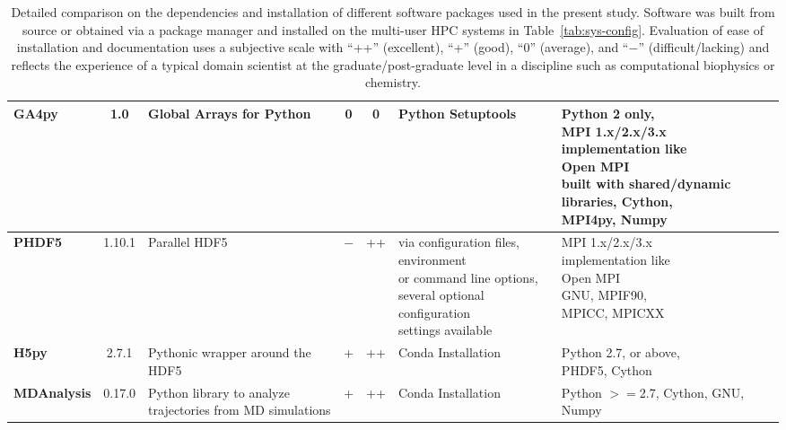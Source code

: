 \begin{table}[ht!]
\begin{adjustbox}{max width=\textwidth}
\begin{tabular}{l c l c c l l}
   \bfseries GA4py & 1.0 & Global Arrays for Python & 0 & 0 & Python Setuptools &\makecell[l]{Python 2 only,\\ MPI 1.x/2.x/3.x  \\implementation like \\ Open MPI \\ built with shared/dynamic \\libraries, Cython,  \\MPI4py, Numpy} \\
   \midrule
   \bfseries PHDF5 & 1.10.1 & Parallel HDF5 & $-$ & ++ & \makecell[l]{via configuration files,\\ environment \\or command line options, \\ several optional configuration\\ settings available} &\makecell[l]{MPI 1.x/2.x/3.x  \\ implementation like \\ Open MPI  \\GNU, MPIF90,  \\MPICC, MPICXX}\\
   \midrule
   \bfseries H5py &  2.7.1 & Pythonic wrapper around the HDF5 & + & ++ & Conda Installation & \makecell[l]{Python 2.7, or above,\\ PHDF5, Cython}\\    
   \midrule
   \bfseries MDAnalysis & 0.17.0 & \makecell[l]{Python library to analyze \\trajectories from MD simulations} & + & ++ & Conda Installation & \makecell[l]{Python $>=$2.7, Cython,\\ GNU, Numpy}\\
  \bottomrule
\end{tabular}
\end{adjustbox}
\caption[Version of the packages used in the present study]%
{Detailed comparison on the dependencies and installation of different software packages used in the present study. Software was built from source or obtained via a package manager and installed on the multi-user HPC systems in Table~\protect\ref{tab:sys-config}. Evaluation of ease of installation and documentation uses a subjective scale with ``++'' (excellent), ``+'' (good), ``0'' (average), and ``$-$'' (difficult/lacking) and reflects the experience of a typical domain scientist at the graduate/post-graduate level in a discipline such as computational biophysics or chemistry.}
\label{tab:version}
\end{table}


